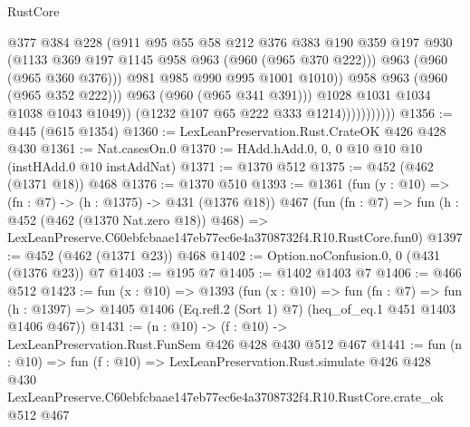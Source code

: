 \begin{lexlean}{RustCore}
\begin{coremodule}
                                    @377
                                    @384
                                    @228
                                    (@911
                                      @95
                                      @55
                                      @58
                                      @212
                                      @376
                                      @383
                                      @190
                                      @359
                                      @197
                                      @930
                                      (@1133 @369 @197 @1145 @958 @963 (@960 (@965 @370 @222)))
                                      @963
                                      (@960 (@965 @360 @376)))
                                    @981
                                    @985
                                    @990
                                    @995
                                    @1001
                                    @1010))
                                @958
                                @963
                                (@960 (@965 @352 @222)))
                              @963
                              (@960 (@965 @341 @391)))
                            @1028
                            @1031
                            @1034
                            @1038
                            @1043
                            @1049))
                        (@1232 @107 @65 @222 @333 @1214)))))))))))
@1356 := @445 (@615 @1354)
@1360 := LexLeanPreservation.Rust.CrateOK @426 @428 @430
@1361 := Nat.casesOn.{0}
@1370 := HAdd.hAdd.{0, 0, 0} @10 @10 @10 (instHAdd.{0} @10 instAddNat)
@1371 := @1370 @512
@1375 := @452 (@462 (@1371 @18)) @468
@1376 := @1370 @510
@1393 := @1361
    (fun (y : @10) => (fn : @7) -> (h : @1375) -> @431 (@1376 @18))
    @467
    (fun (fn : @7) =>
    fun (h : @452 (@462 (@1370 Nat.zero @18)) @468) =>
    LexLeanPreserve.C60ebfcbaae147eb77ec6e4a3708732f4.R10.RustCore.fun0)
@1397 := @452 (@462 (@1371 @23)) @468
@1402 := Option.noConfusion.{0, 0} (@431 (@1376 @23)) @7
@1403 := @195 @7
@1405 := @1402 @1403 @7
@1406 := @466 @512
@1423 := fun (x : @10) =>
  @1393
    (fun (x : @10) =>
    fun (fn : @7) =>
    fun (h : @1397) => @1405 @1406 (Eq.refl.{2} (Sort 1) @7) (heq_of_eq.{1} @451 @1403 @1406 @467))
@1431 := (n : @10) -> (f : @10) -> LexLeanPreservation.Rust.FunSem @426 @428 @430 @512 @467
@1441 := fun (n : @10) =>
  fun (f : @10) =>
  LexLeanPreservation.Rust.simulate
    @426
    @428
    @430
    LexLeanPreserve.C60ebfcbaae147eb77ec6e4a3708732f4.R10.RustCore.crate_ok
    @512
    @467
\end{coremodule}
\end{lexlean}
